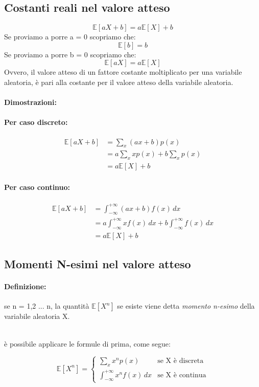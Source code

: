 \documentclass[]{article}
\newcommand{\ev}{\mathbb{E}[X]}
\renewcommand{\ev}[1]{\mathbb{E}[#1]}
\newcommand{\definizione}{\paragraph{Definizione:}}
\begin{document}
    \subsection{Costanti reali nel valore atteso}
    \[ \ev{aX+b} = a \ev{X} + b \]
    Se proviamo a porre a = 0 scopriamo che:
    \[ \ev{b} = b \]
    Se proviamo a porre b = 0 scopriamo che:
    \[ \ev{aX} = a \ev{X} \]
    Ovvero, il valore atteso di un fattore costante moltiplicato per una variabile aleatoria,
    è pari alla costante per il valore atteso della variabile aleatoria.

    \paragraph{Dimostrazioni:}
    \paragraph{Per caso discreto:}
    \begin{equation*}
        \begin{split}
            \ev{aX + b} & = \sum_{x}^{} (ax + b) p(x) \\
            & = a \sum_{x}^{} xp(x) + b \sum_{x}^{} p(x) \\
            & = a\ev{X} + b
        \end{split}
    \end{equation*}
    \paragraph{Per caso continuo:}
    \begin{equation*}
        \begin{split}
            \ev{aX + b} & = \int_{-\infty}^{+\infty} (ax + b) f(x) \, dx \\
            & = a \int_{-\infty}^{+\infty} xf(x) \,dx + b \int_{-\infty}^{+\infty} f(x) \, dx \\
            & = a\ev{X} + b
        \end{split}
    \end{equation*}

    \subsection{Momenti N-esimi nel valore atteso}
    \definizione se n = 1,2 ... n, la quantità $\ev{X^n}$ se esiste viene detta \textit{momento n-esimo} della variabile aleatoria X. \\ \\
    \centerline{è possibile applicare le formule di prima, come segue:}
    \begin{equation*}
        \ev{X^n} =
        \begin{cases}
            \sum_{x}^{} x^n p(x) & \text{se X è discreta} \\
            \int_{-\infty}^{+\infty} x^n f(x) \, dx & \text{se X è continua}
        \end{cases}
    \end{equation*}
\end{document}
